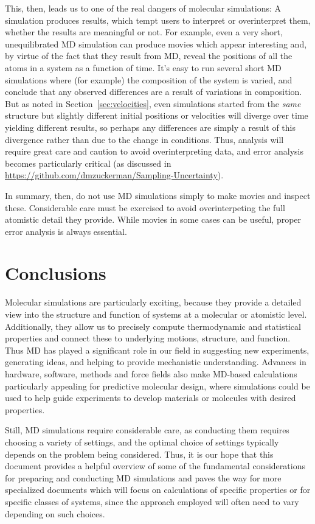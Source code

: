 \documentclass[9pt,bestpractices]{livecoms}
\begin{document}
This, then, leads us to one of the real dangers of molecular simulations: A simulation produces results, which tempt users to interpret or overinterpret them, whether the results are meaningful or not.
For example, even a very short, unequilibrated MD simulation can produce movies which appear interesting and, by virtue of the fact that they result from MD, reveal the positions of all the atoms in a system as a function of time.
It's easy to run several short MD simulations where (for example) the composition of the system is varied, and conclude that any observed differences are a result of variations in composition.
But as noted in Section~\ref{sec:velocities}, even simulations started from the \emph{same} structure but slightly different initial positions or velocities will diverge over time yielding different results, so perhaps any differences are simply a result of this divergence rather than due to the change in conditions.
Thus, analysis will require great care and caution to avoid overinterpreting data, and error analysis becomes particularly critical (as discussed in \url{https://github.com/dmzuckerman/Sampling-Uncertainty}).

In summary, then, do not use MD simulations simply to make movies and inspect these. Considerable care must be exercised to avoid overinterpeting the full atomistic detail they provide.
While movies in some cases can be useful, proper error analysis is always essential.



\section{Conclusions}
Molecular simulations are particularly exciting, because they provide a detailed view into the structure and function of systems at a molecular or atomistic level.
Additionally, they allow us to precisely compute thermodynamic and statistical properties and connect these to underlying motions, structure, and function.
Thus MD has played a significant role in our field in suggesting new experiments, generating ideas, and helping to provide mechanistic understanding.
Advances in hardware, software, methods and force fields also make MD-based calculations particularly appealing for predictive molecular design, where simulations could be used to help guide experiments to develop materials or molecules with desired properties.

Still, MD simulations require considerable care, as conducting them requires choosing a variety of settings, and the optimal choice of settings typically depends on the problem being considered.
Thus, it is our hope that this document provides a helpful overview of some of the fundamental considerations for preparing and conducting MD simulations and paves the way for more specialized documents which will focus on calculations of specific properties or for specific classes of systems, since the approach employed will often need to vary depending on such choices.
\end{document}
